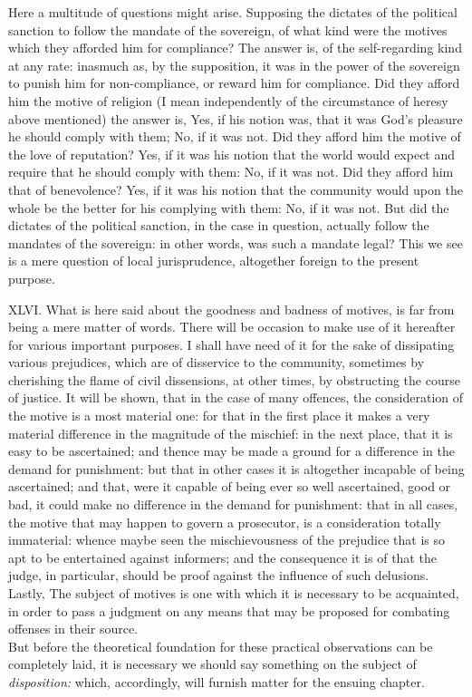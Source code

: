 \documentclass[12pt]{report}
\begin{document}
Here a multitude of questions might arise. Supposing the dictates of the
political sanction to follow the mandate of the sovereign, of what kind
were the motives which they afforded him for compliance? The answer is,
of the self-regarding kind at any rate: inasmuch as, by the supposition,
it was in the power of the sovereign to punish him for non-compliance,
or reward him for compliance. Did they afford him the motive of religion
(I mean independently of the circumstance of heresy above mentioned) the
answer is, Yes, if his notion was, that it was God's pleasure he should
comply with them; No, if it was not. Did they afford him the motive of
the love of reputation? Yes, if it was his notion that the world would
expect and require that he should comply with them: No, if it was not.
Did they afford him that of benevolence? Yes, if it was his notion that
the community would upon the whole be the better for his complying with
them: No, if it was not. But did the dictates of the political sanction,
in the case in question, actually follow the mandates of the sovereign:
in other words, was such a mandate legal? This we see is a mere question
of local jurisprudence, altogether foreign to the present purpose.

XLVI. What is here said about the goodness and badness of motives, is
far from being a mere matter of words. There will be occasion to make
use of it hereafter for various important purposes. I shall have need of
it for the sake of dissipating various prejudices, which are of
disservice to the community, sometimes by cherishing the flame of civil
dissensions, at other times, by obstructing the course of justice. It
will be shown, that in the case of many offences, the consideration of
the motive is a most material one: for that in the first place it makes
a very material difference in the magnitude of the mischief: in the next
place, that it is easy to be ascertained; and thence may be made a
ground for a difference in the demand for punishment: but that in other
cases it is altogether incapable of being ascertained; and that, were it
capable of being ever so well ascertained, good or bad, it could make no
difference in the demand for punishment: that in all cases, the motive
that may happen to govern a prosecutor, is a consideration totally
immaterial: whence maybe seen the mischievousness of the prejudice that
is so apt to be entertained against informers; and the consequence it is
of that the judge, in particular, should be proof against the influence
of such delusions.\\
Lastly, The subject of motives is one with which it is necessary to be
acquainted, in order to pass a judgment on any means that may be
proposed for combating offenses in their source.\\
But before the theoretical foundation for these practical observations
can be completely laid, it is necessary we should say something on the
subject of \emph{disposition:} which, accordingly, will furnish matter
for the ensuing chapter.
\end{document}
